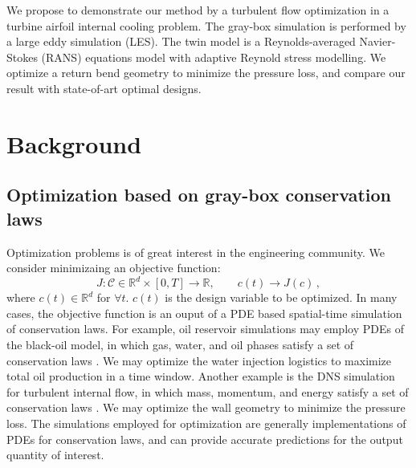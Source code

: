 \documentclass[a4paper,onecolumn]{article}
\theoremstyle{remark}
\begin{document}
\noindent We propose to demonstrate our method by a turbulent flow optimization in a turbine airfoil
internal cooling problem. The gray-box
simulation is performed by a large eddy simulation (LES). 
The twin model is a Reynolds-averaged Navier-Stokes (RANS)
equations model with adaptive Reynold stress modelling. We optimize a return bend
geometry to minimize the pressure loss, and compare our result with state-of-art 
optimal designs.


\newpage
\tableofcontents


\newpage
\section{Background}
\label{intro}

\subsection{Optimization based on gray-box conservation laws}
Optimization problems is of great interest in the engineering community. We consider minimizaing an
objective function:
$$
    J: \mathcal{C} \in \mathbb{R}^d\times [0,T] \rightarrow \mathbb{R}, \qquad c(t) \rightarrow J(c)\,,
$$
where $c(t) \in \mathbb{R}^d$ for $\forall t$. $c(t)$ is the design variable to be optimized.
In many cases, the objective function is an ouput of
a PDE based spatial-time simulation of conservation laws. 
For example, oil reservoir simulations may employ PDEs of the black-oil model, 
in which gas, water, and oil phases satisfy a set of conservation laws 
\cite{reservoir simulation book}. 
We may optimize the water injection logistics to maximize total oil production in a time window.
Another example is the DNS simulation for turbulent internal flow, in which mass, momentum, and energy
satisfy a set of conservation laws
\cite{Wilcox CFD}.
We may optimize the wall geometry to minimize the pressure loss.
The simulations employed for optimization are generally
implementations of PDEs for conservation laws, and can provide accurate predictions for
the output quantity of interest.\\
\end{document}
